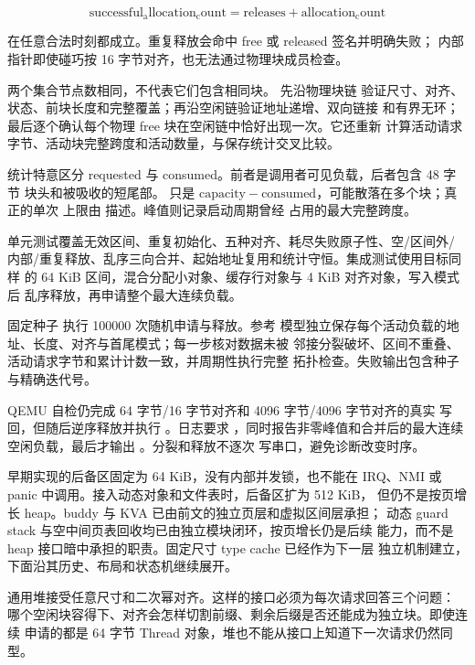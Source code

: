 \[
  \mathrm{successful_allocation_count}
  =
  \mathrm{releases}
  +
  \mathrm{allocation_count}
\]

在任意合法时刻都成立。重复释放会命中 free 或 released 签名并明确失败；
内部指针即使碰巧按 16 字节对齐，也无法通过物理块成员检查。

两个集合节点数相同，不代表它们包含相同块。 先沿物理块链
验证尺寸、对齐、状态、前块长度和完整覆盖；再沿空闲链验证地址递增、双向链接
和有界无环；最后逐个确认每个物理 free 块在空闲链中恰好出现一次。它还重新
计算活动请求字节、活动块完整跨度和活动数量，与保存统计交叉比较。

统计特意区分 requested 与 consumed。前者是调用者可见负载，后者包含 48 字节
块头和被吸收的短尾部。 只是
\(\mathrm{capacity}-\mathrm{consumed}\)，可能散落在多个块；真正的单次
上限由  描述。峰值则记录启动周期曾经
占用的最大完整跨度。

单元测试覆盖无效区间、重复初始化、五种对齐、耗尽失败原子性、空/区间外/
内部/重复释放、乱序三向合并、起始地址复用和统计守恒。集成测试使用目标同样
的 64 KiB 区间，混合分配小对象、缓存行对象与 4 KiB 对齐对象，写入模式后
乱序释放，再申请整个最大连续负载。

固定种子  执行 100000 次随机申请与释放。参考
模型独立保存每个活动负载的地址、长度、对齐与首尾模式；每一步核对数据未被
邻接分裂破坏、区间不重叠、活动请求字节和累计计数一致，并周期性执行完整
拓扑检查。失败输出包含种子与精确迭代号。

QEMU 自检仍完成 64 字节/16 字节对齐和 4096 字节/4096 字节对齐的真实
写回，但随后逆序释放并执行 。日志要求
，同时报告非零峰值和合并后的最大连续
空闲负载，最后才输出 。分裂和释放不逐次
写串口，避免诊断改变时序。

早期实现的后备区固定为 64 KiB，没有内部并发锁，也不能在 IRQ、NMI 或
panic 中调用。接入动态对象和文件表时，后备区扩为 512 KiB，
但仍不是按页增长 heap。buddy 与 KVA 已由前文的独立页层和虚拟区间层承担；
动态 guard stack 与空中间页表回收均已由独立模块闭环，按页增长仍是后续
能力，而不是 heap 接口暗中承担的职责。固定尺寸 type cache 已经作为下一层
独立机制建立，下面沿其历史、布局和状态机继续展开。

通用堆接受任意尺寸和二次幂对齐。这样的接口必须为每次请求回答三个问题：
哪个空闲块容得下、对齐会怎样切割前缀、剩余后缀是否还能成为独立块。即使连续
申请的都是 64 字节 Thread 对象，堆也不能从接口上知道下一次请求仍然同型。


